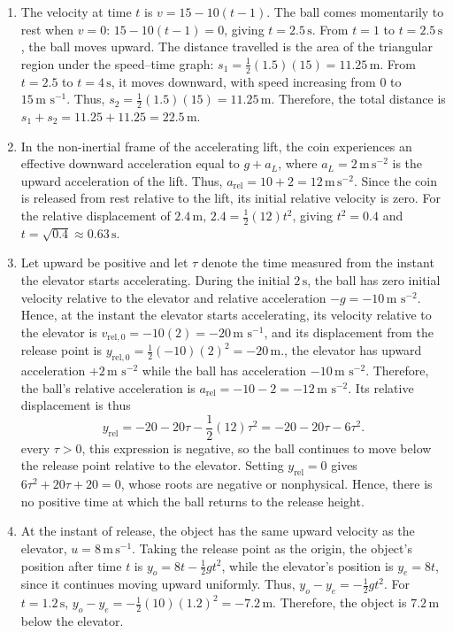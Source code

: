 \documentclass[11pt,a4paper]{article}
\begin{document}
\begin{enumerate}
\item The velocity at time $t$ is $v=15-10(t-1)$. The ball comes momentarily to rest when $v=0$: $15-10(t-1)=0$, giving $t=2.5\,\text{s}$. From $t=1$ to $t=2.5\,\text{s}$, the ball moves upward. The distance travelled is the area of the triangular region under the speed–time graph: $s_1=\frac{1}{2}(1.5)(15)=11.25\,\text{m}$. From $t=2.5$ to $t=4\,\text{s}$, it moves downward, with speed increasing from $0$ to $15\,\text{m s}^{-1}$. Thus, $s_2=\frac{1}{2}(1.5)(15)=11.25\,\text{m}$. Therefore, the total distance is $s_1+s_2=11.25+11.25=22.5\,\text{m}$.
\item In the non-inertial frame of the accelerating lift, the coin experiences an effective downward acceleration equal to $g+a_L$, where $a_L=2\,\mathrm{m\,s^{-2}}$ is the upward acceleration of the lift. Thus, $a_{\mathrm{rel}}=10+2=12\,\mathrm{m\,s^{-2}}$. Since the coin is released from rest relative to the lift, its initial relative velocity is zero. For the relative displacement of $2.4\,\mathrm{m}$, $2.4=\frac{1}{2}(12)t^2$, giving $t^2=0.4$ and $t=\sqrt{0.4}\approx 0.63\,\mathrm{s}$.
\item Let upward be positive and let $\tau$ denote the time measured from the instant the elevator starts accelerating. During the initial $2\,\text{s}$, the ball has zero initial velocity relative to the elevator and relative acceleration $-g=-10\,\text{m s}^{-2}$. Hence, at the instant the elevator starts accelerating, its velocity relative to the elevator is $v_{\text{rel},0}=-10(2)=-20\,\text{m s}^{-1}$, and its displacement from the release point is $y_{\text{rel},0}=\frac12(-10)(2)^2=-20\,\text{m}$.\n\nAfterwards, the elevator has upward acceleration $+2\,\text{m s}^{-2}$ while the ball has acceleration $-10\,\text{m s}^{-2}$. Therefore, the ball's relative acceleration is $a_{\text{rel}}=-10-2=-12\,\text{m s}^{-2}$. Its relative displacement is thus\n\n$$y_{\text{rel}}=-20-20\tau-\frac12(12)\tau^2=-20-20\tau-6\tau^2.$$\n\nFor every $\tau>0$, this expression is negative, so the ball continues to move below the release point relative to the elevator. Setting $y_{\text{rel}}=0$ gives $6\tau^2+20\tau+20=0$, whose roots are negative or nonphysical. Hence, there is no positive time at which the ball returns to the release height.
\item At the instant of release, the object has the same upward velocity as the elevator, \(u=8\,\mathrm{m\,s^{-1}}\). Taking the release point as the origin, the object's position after time \(t\) is \(y_o=8t-\frac{1}{2}gt^2\), while the elevator's position is \(y_e=8t\), since it continues moving upward uniformly. Thus, \(y_o-y_e=-\frac{1}{2}gt^2\). For \(t=1.2\,\mathrm{s}\), \(y_o-y_e=-\frac{1}{2}(10)(1.2)^2=-7.2\,\mathrm{m}\). Therefore, the object is \(7.2\,\mathrm{m}\) below the elevator.

\end{enumerate}
\end{document}
